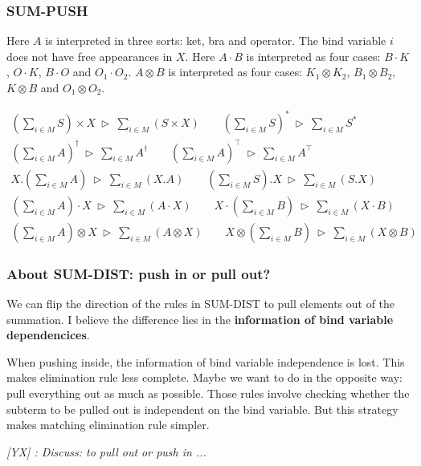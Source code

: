 \documentclass[manuscript, review, timestamp]{acmart}
\newcommand{\yx}[1]{\textit{\color{blue}[YX] : #1}}
\newcommand*{\reduce}{\ \triangleright\ }
\begin{document}
\subsubsection*{\textsf{SUM-PUSH}}

Here $A$ is interpreted in three sorts: ket, bra and operator.
The bind variable $i$ does not have free appearances in $X$.
Here $A \cdot B$ is interpreted as four cases: $B \cdot K$, $O \cdot K$, $B \cdot O$ and $O_1 \cdot O_2$. $A \otimes B$ is interpreted as four cases: $K_1 \otimes K_2$, $B_1 \otimes B_2$, $K \otimes B$ and $O_1 \otimes O_2$.

\begin{gather*}
  (\sum_{i \in M} S) \times X \reduce \sum_{i \in M} (S \times X)
  \qquad
  (\sum_{i \in M} S)^* \reduce \sum_{i \in M} S^* \\
  (\sum_{i \in M} A)^\dagger \reduce \sum_{i \in M} A^\dagger
  \qquad
  (\sum_{i \in M} A)^\top \reduce \sum_{i \in M} A^\top \\
  X.(\sum_{i \in M} A) \reduce \sum_{i \in M} (X.A)
  \qquad
  (\sum_{i \in M} S). X \reduce \sum_{i \in M} (S.X) \\
  (\sum_{i \in M} A) \cdot X \reduce \sum_{i \in M} (A \cdot X) 
  \qquad
  X \cdot (\sum_{i \in M} B) \reduce \sum_{i \in M} (X \cdot B) \\
  (\sum_{i \in M} A) \otimes X \reduce \sum_{i \in M} (A \otimes X) 
  \qquad
  X \otimes (\sum_{i \in M} B) \reduce \sum_{i \in M} (X \otimes B)
\end{gather*}

\subsubsection*{About \textsf{SUM-DIST}: push in or pull out?}
We can flip the direction of the rules in \textsf{SUM-DIST} to pull elements out of the summation. I believe the difference lies in the \textbf{information of bind variable dependencices}.

When pushing inside, the information of bind variable independence is lost. This makes elimination rule less complete. Maybe we want to do in the opposite way: pull everything out as much as possible. Those rules involve checking whether the subterm to be pulled out is independent on the bind variable. But this strategy makes matching elimination rule simpler.

\yx{Discuss: to pull out or push in ...}

\end{document}
